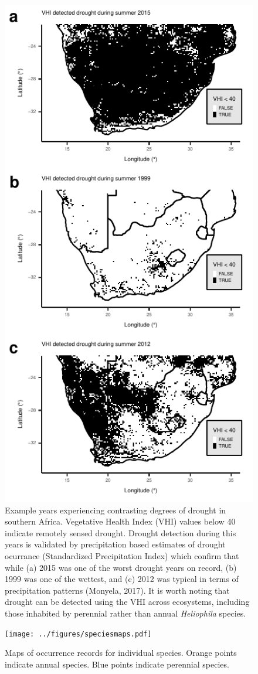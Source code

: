 \documentclass[man,floatsintext]{apa6}
\theoremstyle{definition}
\theoremstyle{definition}
\theoremstyle{definition}
\theoremstyle{remark}
\begin{document}
\begin{figure}
\centering
\includegraphics{../figures/maps_drought_examples.pdf}
\caption{\label{fig:mapsdroughtexamples}Example years experiencing contrasting degrees
of drought in southern Africa. Vegetative Health Index (VHI) values
below 40 indicate remotely sensed drought. Drought detection during this
years is validated by precipitation based estimates of drought ocurrance
(Standardized Precipitation Index) which confirm that while (a) 2015 was
one of the worst drought years on record, (b) 1999 was one of the
wettest, and (c) 2012 was typical in terms of precipitation patterns
(Monyela, 2017). It is worth noting that drought can be detected using
the VHI across ecosystems, including those inhabited by perennial rather
than annual \emph{Heliophila} species.}
\end{figure}





\begin{figure}
\centering
\texttt{[image: ../figures/speciesmaps.pdf]}
\caption{\label{fig:speciesmaps}Maps of occurrence records for individual species.
Orange points indicate annual species. Blue points indicate perennial
species.}
\end{figure}
\end{document}
